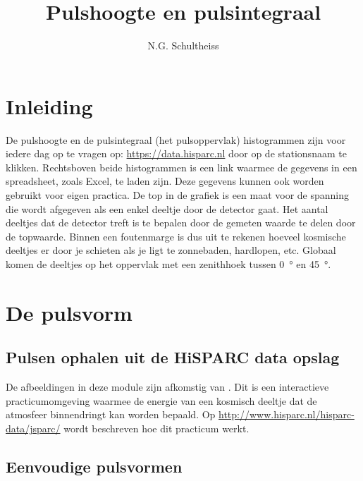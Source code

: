

\title{Pulshoogte en pulsintegraal}
\author{N.G. Schultheiss}



\maketitle

\section{Inleiding}

De pulshoogte en de pulsintegraal (het pulsoppervlak) histogrammen zijn
voor iedere dag op te vragen op: \url{https://data.hisparc.nl} door op de
stationsnaam te klikken. Rechtsboven beide histogrammen is een link
waarmee de gegevens in een spreadsheet, zoals Excel, te laden zijn. Deze
gegevens kunnen ook worden gebruikt voor eigen practica. De top in de
grafiek is een maat voor de spanning die wordt afgegeven als een enkel
deeltje door de detector gaat. Het aantal deeltjes dat de detector treft
is te bepalen door de gemeten waarde te delen door de topwaarde. Binnen
een foutenmarge is dus uit te rekenen hoeveel kosmische deeltjes er door
je schieten als je ligt te zonnebaden, hardlopen, etc. Globaal komen de
deeltjes op het oppervlak met een zenithhoek tussen \SI{0}{\degree} en
\SI{45}{\degree}.


\section{De pulsvorm}


\subsection{Pulsen ophalen uit de HiSPARC data opslag}

De afbeeldingen in deze module zijn afkomstig van \jsparc. Dit is een
interactieve practicumomgeving waarmee de energie van een kosmisch
deeltje dat de atmosfeer binnendringt kan worden bepaald. Op
\url{http://www.hisparc.nl/hisparc-data/jsparc/} wordt beschreven hoe
dit practicum werkt.


\subsection{Eenvoudige pulsvormen}

